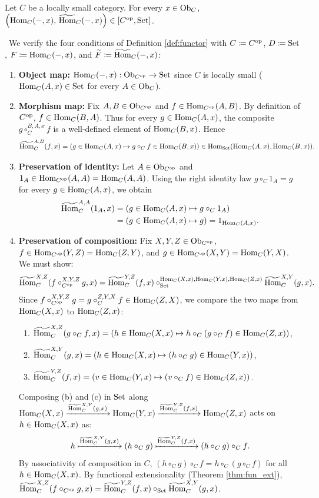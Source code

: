 \documentclass[10pt,a4paper]{article}
\begin{document}
\begin{lemma}\label{lem:contra_hom}
Let $C$ be a locally small category. For every $x \in {\textrm{Ob}}_C$, $\left({\textrm{Hom}}_C(-, x),\, {\widetilde{{\textrm{Hom}}}\textrm{}}_C(-,x)\right) \in [C^{\textrm{op}},{\textrm{Set}}]$.
\end{lemma}
\myprf\ We verify the four conditions of Definition \ref{def:functor} with $C \coloneqq C^{\textrm{op}}$, $D \coloneqq {\textrm{Set}}$, $F \coloneqq {\textrm{Hom}}_C(-,x)$, and ${\widetilde{F}\textrm{}} \coloneqq {\widetilde{{\textrm{Hom}}}\textrm{}}_C(-,x)$:
\begin{enumerate}
\item \textbf{Object map:} ${\textrm{Hom}}_C(-, x) : {\textrm{Ob}}_{C^{\textrm{op}}} \to {\textrm{Set}}$ since $C$ is locally small (${\textrm{Hom}}_C(A,x) \in {\textrm{Set}}$ for every $A \in {\textrm{Ob}}_C$).
\item \textbf{Morphism map:} Fix $A,B \in {\textrm{Ob}}_{C^{\textrm{op}}}$ and $f \in {\textrm{Hom}}_{C^{\textrm{op}}}(A,B)$. By definition of $C^{\textrm{op}}$, $f \in {\textrm{Hom}}_C(B,A)$. Thus for every $g \in {\textrm{Hom}}_C(A,x)$, the composite $g \circ_C^{B,A,x} f$ is a well-defined element of ${\textrm{Hom}}_C(B,x)$. Hence
$${\widetilde{{\textrm{Hom}}}\textrm{}}_C^{A,B}(f, x) = \left(g \in {\textrm{Hom}}_C(A,x) \mapsto g \circ_C f \in {\textrm{Hom}}_C(B,x)\right) \in {\textrm{Hom}}_{\textrm{Set}}({\textrm{Hom}}_C(A,x), {\textrm{Hom}}_C(B,x)).$$
\item \textbf{Preservation of identity:} Let $A \in {\textrm{Ob}}_{C^{\textrm{op}}}$ and $1_A \in {\textrm{Hom}}_{C^{\textrm{op}}}(A,A) = {\textrm{Hom}}_C(A,A)$. Using the right identity law $g \circ_C 1_A = g$ for every $g \in {\textrm{Hom}}_C(A,x)$, we obtain
\begin{align*}
{\widetilde{{\textrm{Hom}}}\textrm{}}_C^{A,A}(1_A, x) &= \left(g \in {\textrm{Hom}}_C(A,x) \mapsto g \circ_C 1_A\right) \\
&= \left(g \in {\textrm{Hom}}_C(A,x) \mapsto g\right) = 1_{{\textrm{Hom}}_C(A,x)}.
\end{align*}
\item \textbf{Preservation of composition:} Fix $X,Y,Z \in {\textrm{Ob}}_{C^{\textrm{op}}}$, $f \in {\textrm{Hom}}_{C^{\textrm{op}}}(Y,Z) = {\textrm{Hom}}_C(Z,Y)$, and $g \in {\textrm{Hom}}_{C^{\textrm{op}}}(X,Y) = {\textrm{Hom}}_C(Y,X)$. We must show:
$${\widetilde{{\textrm{Hom}}}\textrm{}}_C^{X,Z}(f \circ_{C^{\textrm{op}}}^{X,Y,Z} g, x) = {\widetilde{{\textrm{Hom}}}\textrm{}}_C^{Y,Z}(f,x) \circ_{\textrm{Set}}^{{\textrm{Hom}}_C(X,x),{\textrm{Hom}}_C(Y,x),{\textrm{Hom}}_C(Z,x)} {\widetilde{{\textrm{Hom}}}\textrm{}}_C^{X,Y}(g,x).$$
Since $f \circ_{C^{\textrm{op}}}^{X,Y,Z} g = g \circ_C^{Z,Y,X} f \in {\textrm{Hom}}_C(Z,X)$, we compare the two maps from ${\textrm{Hom}}_C(X,x)$ to ${\textrm{Hom}}_C(Z,x)$:
\begin{enumerate}
\item[(a)] ${\widetilde{{\textrm{Hom}}}\textrm{}}_C^{X,Z}(g \circ_C f, x) = \left(h \in {\textrm{Hom}}_C(X,x) \mapsto h \circ_C (g \circ_C f) \in {\textrm{Hom}}_C(Z,x)\right)$,
\item[(b)] ${\widetilde{{\textrm{Hom}}}\textrm{}}_C^{X,Y}(g, x) = \left(h \in {\textrm{Hom}}_C(X,x) \mapsto (h \circ_C g) \in {\textrm{Hom}}_C(Y,x)\right)$,
\item[(c)] ${\widetilde{{\textrm{Hom}}}\textrm{}}_C^{Y,Z}(f, x) = \left(v \in {\textrm{Hom}}_C(Y,x) \mapsto (v \circ_C f) \in {\textrm{Hom}}_C(Z,x)\right)$.
\end{enumerate}
Composing (b) and (c) in ${\textrm{Set}}$ along ${\textrm{Hom}}_C(X,x) \xrightarrow{{\widetilde{{\textrm{Hom}}}\textrm{}}_C^{X,Y}(g, x)} {\textrm{Hom}}_C(Y,x) \xrightarrow{{\widetilde{{\textrm{Hom}}}\textrm{}}_C^{Y,Z}(f, x)} {\textrm{Hom}}_C(Z,x)$ acts on $h \in {\textrm{Hom}}_C(X,x)$ as:
$$h \xmapsto{{\widetilde{{\textrm{Hom}}}\textrm{}}_C^{X,Y}(g, x)} (h \circ_C g) \xmapsto{{\widetilde{{\textrm{Hom}}}\textrm{}}_C^{Y,Z}(f, x)} (h \circ_C g) \circ_C f.$$
By associativity of composition in $C$, $(h \circ_C g) \circ_C f = h \circ_C (g \circ_C f)$ for all $h \in {\textrm{Hom}}_C(X,x)$. By functional extensionality (Theorem \ref{thm:fun_ext}), ${\widetilde{{\textrm{Hom}}}\textrm{}}_C^{X,Z}(f \circ_{C^{\textrm{op}}} g, x) = {\widetilde{{\textrm{Hom}}}\textrm{}}_C^{Y,Z}(f,x) \circ_{\textrm{Set}} {\widetilde{{\textrm{Hom}}}\textrm{}}_C^{X,Y}(g,x)$.
\end{enumerate}
\end{document}
